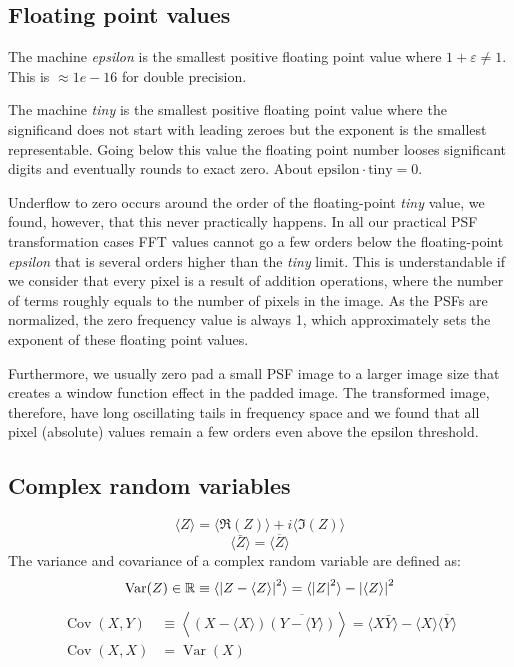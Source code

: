 \subsection{Floating point values\label{sec:floating_point}}
The machine \emph{epsilon} is the smallest positive floating point value
where \(1 + \varepsilon \neq 1\). This is \(\approx 1e-16\) for double
precision.
%
\par The machine \emph{tiny} is the smallest positive floating point value
where the significand does not start with leading zeroes but the exponent is
the smallest representable. Going below this value the floating point number
looses significant digits and eventually rounds to exact zero. About
\(\mathrm{epsilon}\cdot\mathrm{tiny} = 0\).
%
\par Underflow to zero occurs around the order of the floating-point
\emph{tiny} value, we found, however, that this never practically
happens. In all our practical PSF transformation cases FFT values
cannot go a few orders below the floating-point \emph{epsilon} that is
several orders higher than the \emph{tiny} limit. This is
understandable if we consider that every pixel is a result of addition
operations, where the number of terms roughly equals to the number of
pixels in the image. As the PSFs are normalized, the zero frequency
value is always 1, which approximately sets the exponent of these
floating point values.
%
\par Furthermore, we usually zero pad a small PSF image to a larger image
size that creates a window function effect in the padded image. The
transformed image, therefore, have long oscillating tails in frequency space
and we found that all pixel (absolute) values remain a few orders even above
the epsilon threshold.
%
\subsection{Complex random variables}
%
\begin{equation}
\langle Z\rangle = \langle\Re(Z)\rangle + i\langle\Im(Z)\rangle
\end{equation}
%
\begin{equation}
\langle \bar{Z}\rangle = \overline{\langle Z\rangle}
\end{equation}
%
\newcommand{\Var}{\mathrm{Var}}
%
The variance and covariance of a complex random variable are defined as:
\begin{equation}
\operatorname{Var}(Z) \in \mathbb{R} \equiv \langle\abs{Z-\langle Z \rangle}^2 \rangle =
\langle\abs{Z}^2\rangle - \abs{\langle Z \rangle}^2
\end{equation}
%
\begin{align}
\operatorname{Cov}(X, Y) &\equiv \left\langle\left(X - \langle X \rangle\right)
\overline{\left(Y - \langle Y \rangle\right)} \right\rangle
= \langle X\bar{Y} \rangle - \langle X \rangle \overline{\langle Y \rangle} \\
\operatorname{Cov}(X, X) &= \operatorname{Var}(X)
\end{align}
%

